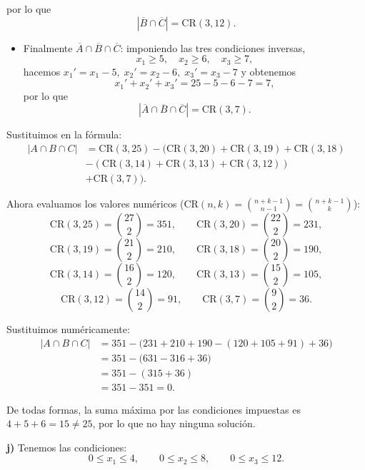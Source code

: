 \documentclass[a4paper,12pt]{article}
\begin{document}
\begin{ejercicio}[title=Ejercicio 31]
por lo que
\[
|\overline{B}\cap\overline{C}| = \mathrm{CR}(3,12).
\]
\begin{itemize}

\item Finalmente \(\overline{A}\cap\overline{B}\cap\overline{C}\): imponiendo las tres condiciones inversas,
\[
x_1\ge 5,\quad x_2\ge 6,\quad x_3\ge 7,
\]
hacemos \(x_1' = x_1-5,\; x_2' = x_2-6,\; x_3' = x_3-7\) y obtenemos
\[
x_1' + x_2' + x_3' = 25-5-6-7 = 7,
\]
por lo que
\[
|\overline{A}\cap\overline{B}\cap\overline{C}| = \mathrm{CR}(3,7).
\]

\end{itemize}

Sustituimos en la fórmula:
\[
\begin{aligned}
|A\cap B \cap C|
&= \mathrm{CR}(3,25) - \Big(\mathrm{CR}(3,20) + \mathrm{CR}(3,19) + \mathrm{CR}(3,18) \\
&- (\mathrm{CR}(3,14) + \mathrm{CR}(3,13) + \mathrm{CR}(3,12)) \\
&+ \mathrm{CR}(3,7)\Big).
\end{aligned}
\]

Ahora evaluamos los valores numéricos ($\mathrm{CR}(n,k)=\binom{n+k-1}{n-1}=\binom{n+k-1}{k}$):
\[
\mathrm{CR}(3,25)=\binom{27}{2}=351,\qquad
\mathrm{CR}(3,20)=\binom{22}{2}=231,
\]
\[
\mathrm{CR}(3,19)=\binom{21}{2}=210,\qquad
\mathrm{CR}(3,18)=\binom{20}{2}=190,
\]
\[
\mathrm{CR}(3,14)=\binom{16}{2}=120,\qquad
\mathrm{CR}(3,13)=\binom{15}{2}=105,
\]
\[
\mathrm{CR}(3,12)=\binom{14}{2}=91,\qquad
\mathrm{CR}(3,7)=\binom{9}{2}=36.
\]

Sustituimos numéricamente:
\[
\begin{aligned}
|A\cap B \cap C|
&= 351 - \Big(231 + 210 + 190 - (120 + 105 + 91) + 36\Big) \\
&= 351 - \Big(631 - 316 + 36\Big) \\
&= 351 - (315 + 36) \\
&= 351 - 351 = \boxed{0}.
\end{aligned}
\]

De todas formas, la suma máxima por las condiciones impuestas es $4+5+6 = 15 \ne 25$, por lo que no hay ninguna solución.

\bigskip

\textbf{j)} Tenemos las condiciones:
\[
0 \le x_1 \le 4,\qquad 0 \le x_2 \le 8,\qquad 0 \le x_3 \le 12.
\]

\end{ejercicio}
\end{document}
